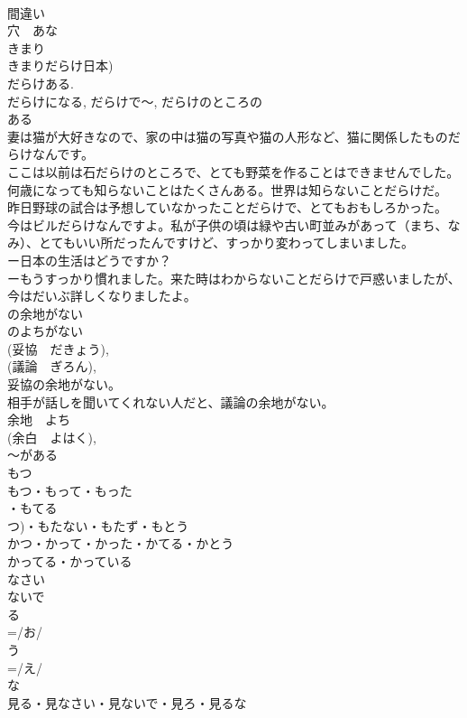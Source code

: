 \documentclass[8pt]{extreport}
\begin{document}
\begin{CJK}{UTF8}{min}
\\	間違い 
\\	穴　あな 
\\	きまり 
\\	きまりだらけ日本)
\\	だらけある. 
\\	だらけになる, だらけで～, だらけのところの
\\	ある 
\\	妻は猫が大好きなので、家の中は猫の写真や猫の人形など、猫に関係したものだらけなんです。
\\	ここは以前は石だらけのところで、とても野菜を作ることはできませんでした。
\\	何歳になっても知らないことはたくさんある。世界は知らないことだらけだ。
\\	昨日野球の試合は予想していなかったことだらけで、とてもおもしろかった。
\\	今はビルだらけなんですよ。私が子供の頃は緑や古い町並みがあって（まち、なみ）、とてもいい所だったんですけど、すっかり変わってしまいました。
\\	ー日本の生活はどうですか？
\\	ーもうすっかり慣れました。来た時はわからないことだらけで戸惑いましたが、今はだいぶ詳しくなりましたよ。	
\\	の余地がない
\\	のよちがない
\\	(妥協　だきょう), 
\\	(議論　ぎろん), 
\\	妥協の余地がない。
\\	相手が話しを聞いてくれない人だと、議論の余地がない。
\\	余地　よち
\\	(余白　よはく), 
\\	～がある
\\	もつ
\\	もつ・もって・もった
\\	・もてる
\\	つ)・もたない・もたず・もとう
\\	かつ・かって・かった・かてる・かとう
\\	かってる・かっている 
\\	なさい
\\	ないで
\\	る
\\	=/お/
\\	う
\\	=/え/
\\	な
\\	見る・見なさい・見ないで・見ろ・見るな　

\end{CJK}
\end{document}
